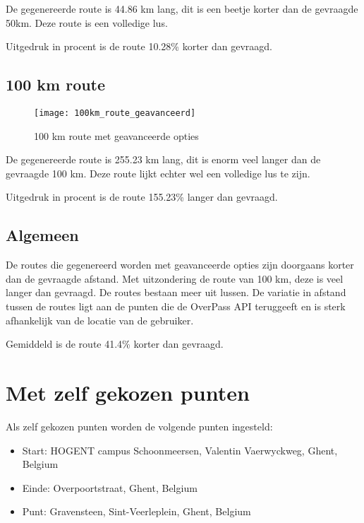 De gegenereerde route is 44.86 km lang, dit is een beetje korter dan de gevraagde 50km. Deze route is een volledige lus.

Uitgedruk in procent is de route 10.28\% korter dan gevraagd.

\subsection{100 km route}

\begin{figure}[H]
    \centering
    \texttt{[image: 100km\_route\_geavanceerd]}
    \caption{100 km route met geavanceerde opties}
    \label{fig:100km_route_geavanceerd}
\end{figure}

De gegenereerde route is 255.23 km lang, dit is enorm veel langer dan de gevraagde 100 km. Deze route lijkt echter wel een volledige lus te zijn.

Uitgedruk in procent is de route 155.23\% langer dan gevraagd.


\pagebreak

\subsection{Algemeen}

De routes die gegenereerd worden met geavanceerde opties zijn doorgaans korter dan de gevraagde afstand. Met uitzondering de route van 100 km, deze is veel langer dan gevraagd.
De routes bestaan meer uit lussen. De variatie in afstand tussen de routes ligt aan de punten die de OverPass API teruggeeft en is sterk afhankelijk van de locatie van de gebruiker.

Gemiddeld is de route 41.4\% korter dan gevraagd.

\section{Met zelf gekozen punten}

Als zelf gekozen punten worden de volgende punten ingesteld:
\begin{itemize}
    \item Start: HOGENT campus Schoonmeersen, Valentin Vaerwyckweg, Ghent, Belgium
    \item Einde: Overpoortstraat, Ghent, Belgium
    \item Punt: Gravensteen, Sint-Veerleplein, Ghent, Belgium
\end{itemize}

